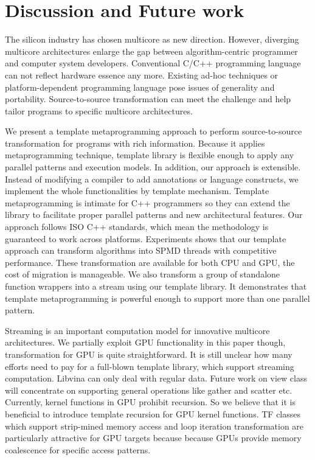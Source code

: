\section{Discussion and Future work}
The silicon industry has chosen multicore as new
direction. However, diverging multicore architectures enlarge the gap between algorithm-centric programmer and
computer system developers.  Conventional C/C++ programming language
can not reflect hardware essence any more.  Existing ad-hoc techniques
or platform-dependent programming language pose issues of generality
and portability. Source-to-source transformation can meet the challenge
and help tailor programs to specific multicore architectures.


We present a template metaprogramming approach to perform source-to-source
transformation for programs with rich information. Because it applies 
metaprogramming technique, template library is flexible enough to
apply any parallel
patterns and execution models. In addition, our approach
is extensible. Instead of modifying a compiler to add
annotations or language constructs, we implement the whole
functionalities by template mechanism. Template metaprogramming is
intimate for C++ programmers so they can extend the library to
facilitate proper parallel patterns and new architectural
features.  Our approach follows ISO C++ standards, which mean the
methodology is guaranteed to work across platforms.  Experiments shows
that our template approach can transform algorithms into SPMD threads
with competitive performance. These transformation are available for
both CPU and GPU, the cost of migration is manageable. We also
transform a group of standalone function wrappers into a
stream using our template library. It demonstrates that template
metaprogramming is powerful enough to support more than one parallel pattern.


Streaming is an important computation model for innovative
multicore architectures. We partially exploit GPU functionality in this
paper though, transformation for GPU is quite
straightforward.  It is still unclear how many efforts need to
pay for a full-blown template library, which support
streaming computation. Libvina can only deal with regular
data. Future work on view class  will concentrate on supporting general operations like gather and scatter etc.  
Currently, kernel functions in GPU prohibit recursion. So we believe that
it is beneficial to introduce template recursion for GPU kernel functions. TF classes which support strip-mined memory access and loop iteration transformation are
particularly attractive for GPU targets because because  GPUs
provide memory coalescence for specific access patterns.


